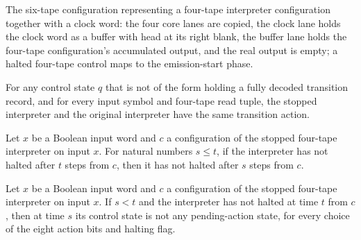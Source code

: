 \begin{definition}
\label{Turing.timedLift}
\leanok
{}
The six-tape configuration representing a four-tape interpreter configuration
together with a clock word: the four core lanes are copied, the clock lane
holds the clock word as a buffer with head at its right blank, the buffer lane
holds the four-tape configuration's accumulated output, and the real output is
empty; a halted four-tape control maps to the emission-start phase.
\end{definition}

\begin{lemma}
\label{Turing.timedCut_regular}
\leanok
{}
For any control state $q$ that is not of the form holding a fully decoded transition
record, and for every input symbol and four-tape read tuple, the stopped interpreter and
the original interpreter have the same transition action.
\end{lemma}

\begin{lemma}
\label{Turing.timedCut_live_before}
\leanok
{}
Let $x$ be a Boolean input word and $c$ a configuration of the stopped four-tape
interpreter on input $x$. For natural numbers $s\le t$, if the interpreter has not
halted after $t$ steps from $c$, then it has not halted after $s$ steps from $c$.
\end{lemma}

\begin{lemma}
\label{Turing.timedCut_no_record}
\leanok
{}
Let $x$ be a Boolean input word and $c$ a configuration of the stopped four-tape
interpreter on input $x$. If $s<t$ and the interpreter has not halted at time $t$ from
$c$, then at time $s$ its control state is not any pending-action state, for every
choice of the eight action bits and halting flag.
\end{lemma}

